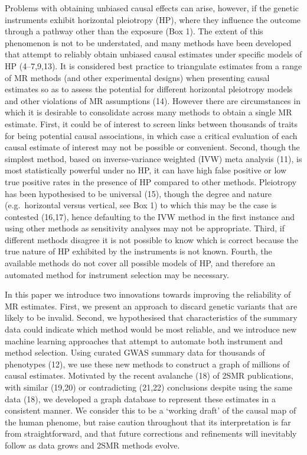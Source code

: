 \documentclass[]{article}
\begin{document}
Problems with obtaining unbiased causal effects can arise, however, if
the genetic instruments exhibit horizontal pleiotropy (HP), where they
influence the outcome through a pathway other than the exposure (Box 1).
The extent of this phenomenon is not to be understated, and many methods
have been developed that attempt to reliably obtain unbiased causal
estimates under specific models of HP (4--7,9,13). It is considered best
practice to triangulate estimates from a range of MR methods (and other
experimental designs) when presenting causal estimates so as to assess
the potential for different horizontal pleiotropy models and other
violations of MR assumptions (14). However there are circumstances in
which it is desirable to consolidate across many methods to obtain a
single MR estimate. First, it could be of interest to screen links
between thousands of traits for being potential causal associations, in
which case a critical evaluation of each causal estimate of interest may
not be possible or convenient. Second, though the simplest method, based
on inverse-variance weighted (IVW) meta analysis (11), is most
statistically powerful under no HP, it can have high false positive or
low true positive rates in the presence of HP compared to other methods.
Pleiotropy has been hypothesised to be universal (15), though the degree
and nature (e.g.~horizontal versus vertical, see Box 1) to which this
may be the case is contested (16,17), hence defaulting to the IVW method
in the first instance and using other methods as sensitivity analyses
may not be appropriate. Third, if different methods disagree it is not
possible to know which is correct because the true nature of HP
exhibited by the instruments is not known. Fourth, the available methods
do not cover all possible models of HP, and therefore an automated
method for instrument selection may be necessary.

In this paper we introduce two innovations towards improving the
reliability of MR estimates. First, we present an approach to discard
genetic variants that are likely to be invalid. Second, we hypothesised
that characteristics of the summary data could indicate which method
would be most reliable, and we introduce new machine learning approaches
that attempt to automate both instrument and method selection. Using
curated GWAS summary data for thousands of phenotypes (12), we use these
new methods to construct a graph of millions of causal estimates.
Motivated by the recent avalanche (18) of 2SMR publications, with
similar (19,20) or contradicting (21,22) conclusions despite using the
same data (18), we developed a graph database to represent these
estimates in a consistent manner. We consider this to be a `working
draft' of the causal map of the human phenome, but raise caution
throughout that its interpretation is far from straightforward, and that
future corrections and refinements will inevitably follow as data grows
and 2SMR methods evolve.
\end{document}
